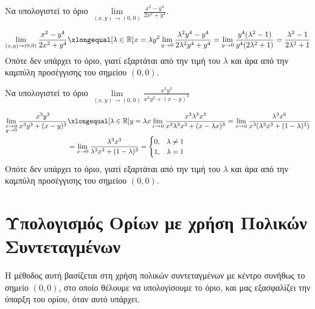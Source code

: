 \begin{example}
  Να υπολογιστεί το όριο $ \lim\limits_{(x,y)\to (0, 0)} \frac{x^{2}-y^{4}}
  {2x^{2}+y^{4}} $. 
  \begin{solution}
    \[
      \lim\limits_{(x,y)\to (0, 0)} \frac{x^{2}-y^{4}}
      {2x^{2}+y^{4}} \xlongequal[\lambda \in \mathbb{R}]
      {x= \lambda y^{2}} \lim_{y \to 0} 
      \frac{\lambda ^{2}y^{4}-y^{4}}{2 \lambda ^{2}y^{4}+y^{4}} = 
      \lim_{y \to 0} \frac{y^{4}(\lambda ^{2}-1)}
      {y^{4}(2 \lambda ^{2}+1)} = 
      \frac{\lambda ^{2}-1}{2 \lambda ^{2}+1} 
    \] 
    Οπότε δεν υπάρχει το όριο, γιατί εξαρτάται από την τιμή του $ \lambda $ 
    και άρα από την καμπύλη προσέγγισης του σημείου $ (0,0) $.
  \end{solution}
\end{example}

\begin{example}
  Να υπολογιστεί το όριο 
  $ \lim\limits_{(x,y)\to (0, 0)} \frac{x^{3}y^{3}}{x^{3}y^{3}+ (x-y)^{3}} $ 
  \begin{solution}
  \item {}
    \begin{align*}
      \lim\limits_{\substack{x \to 0\\ y \to 0}} \frac{x^{3}y^{3}}{x^{3}y^{3} + 
      (x-y)^{3}} 
    &\xlongequal[\lambda \in \mathbb{R}]{y = \lambda x} \lim_{x \to 0} \frac{x^{3} 
    \lambda ^{3} x^{3}}{x^{3} \lambda ^{3} x^{3} + (x - \lambda x)^{3}} 
    = \lim_{x \to 0} \frac{\lambda ^{3}x^{6}}{x^{3} 
    (\lambda ^{3} x^{3} + (1- \lambda)^{3})} \\
    &= \lim_{x \to 0} \frac{\lambda ^{3} x^{3}}{\lambda ^{3}x^{3} + (1- \lambda)^{3}} 
    = 
    \begin{cases} 
      0, & \lambda \neq 1 \\ 
      1, & \lambda = 1 
    \end{cases} 
    \end{align*} 
    Οπότε δεν υπάρχει το όριο, γιατί εξαρτάται από την τιμή του 
    $ \lambda $ και άρα από την καμπύλη προσέγγισης του σημείου 
    $ (0,0) $.
  \end{solution}
\end{example}


\section{Υπολογισμός Ορίων με χρήση Πολικών Συντεταγμένων}

Η μέθοδος αυτή βασίζεται στη χρήση πολικών συντεταγμένων με κέντρο συνήθως το σημείο 
$ (0,0) $, στο οποίο θέλουμε να υπολογίσουμε το όριο, και μας εξασφαλίζει 
την ύπαρξη του ορίου, όταν αυτό υπάρχει.

